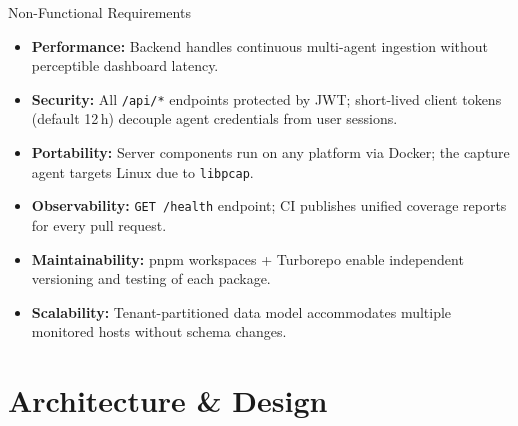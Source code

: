 \documentclass[aspectratio=169]{beamer}
\begin{document}
\begin{frame}{Non-Functional Requirements}
    \begin{itemize}
        \item \textbf{Performance:} Backend handles continuous multi-agent ingestion without
              perceptible dashboard latency.
        \item \textbf{Security:} All \texttt{/api/*} endpoints protected by JWT; short-lived
              client tokens (default 12\,h) decouple agent credentials from user sessions.
        \item \textbf{Portability:} Server components run on any platform via Docker;
              the capture agent targets Linux due to \texttt{libpcap}.
        \item \textbf{Observability:} \texttt{GET /health} endpoint; CI publishes unified
              coverage reports for every pull request.
        \item \textbf{Maintainability:} pnpm workspaces + Turborepo enable independent
              versioning and testing of each package.
        \item \textbf{Scalability:} Tenant-partitioned data model accommodates multiple
              monitored hosts without schema changes.
    \end{itemize}
\end{frame}

\section{Architecture \& Design}
\end{document}
